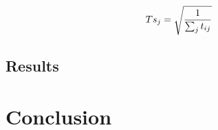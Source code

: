 \documentclass[twoside,twocolumn]{article}
\begin{document}
\begin{equation}
\begin{aligned}
Ts_j = \sqrt{1\over{\sum_j{t_{ij}}}}
\end{aligned}
\end{equation}

\subsection{Results}










\section{Conclusion}






\end{document}
